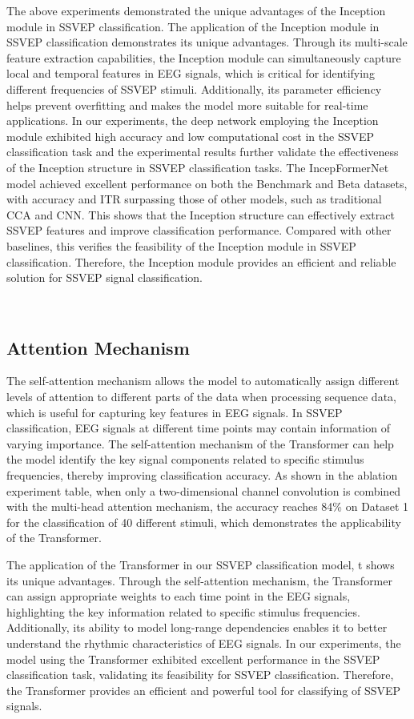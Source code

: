 \documentclass[10pt]{iopart}
\begin{document}
The above experiments demonstrated the unique advantages of the Inception module in SSVEP classification. The application of the Inception module in SSVEP classification demonstrates its unique advantages. Through its multi-scale feature extraction capabilities, the Inception module can simultaneously capture local and temporal features in EEG signals, which is critical for identifying different frequencies of SSVEP stimuli. Additionally, its parameter efficiency helps prevent overfitting and makes the model more suitable for real-time applications. In our experiments, the deep network employing the Inception module exhibited high accuracy and low computational cost in the SSVEP classification task and the experimental results further validate the effectiveness of the Inception structure in SSVEP classification tasks. The IncepFormerNet model achieved excellent performance on both the Benchmark and Beta datasets, with accuracy and ITR surpassing those of other models, such as traditional CCA and CNN. This shows that the Inception structure can effectively extract SSVEP features and improve classification performance. Compared with other baselines, this verifies the feasibility of the Inception module in SSVEP classification. Therefore, the Inception module provides an efficient and reliable solution for SSVEP signal classification.

‌\subsection{Attention Mechanism}
The self-attention mechanism allows the model to automatically assign different levels of attention to different parts of the data when processing sequence data\cite{chen2023transformer}, which is useful for capturing key features in EEG signals. In SSVEP classification, EEG signals at different time points may contain information of varying importance. The self-attention mechanism of the Transformer can help the model identify the key signal components related to specific stimulus frequencies, thereby improving classification accuracy. As shown in the ablation experiment table, when only a two-dimensional channel convolution is combined with the multi-head attention mechanism, the accuracy reaches 84\% on Dataset 1 for the classification of 40 different stimuli, which demonstrates the applicability of the Transformer.



The application of the Transformer in our SSVEP classification model, t shows its unique advantages. Through the self-attention mechanism, the Transformer can assign appropriate weights to each time point in the EEG signals, highlighting the key information related to specific stimulus frequencies. Additionally, its ability to model long-range dependencies enables it to better understand the rhythmic characteristics of EEG signals. In our experiments, the model using the Transformer exhibited excellent performance in the SSVEP classification task, validating its feasibility for SSVEP classification. Therefore, the Transformer provides an efficient and powerful tool for classifying of SSVEP signals.
\end{document}
